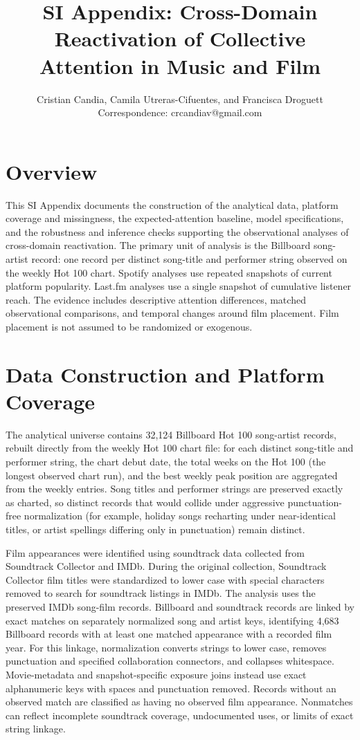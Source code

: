 \documentclass[11pt]{article}
\title{\textbf{SI Appendix: Cross-Domain Reactivation of Collective Attention in Music and Film}}
\author{Cristian Candia, Camila Utreras-Cifuentes, and Francisca Droguett\\[4pt]\small Correspondence: crcandiav@gmail.com}
\date{}
\begin{document}
\maketitle

\section*{Overview}

This SI Appendix documents the construction of the analytical data, platform coverage and missingness, the expected-attention baseline, model specifications, and the robustness and inference checks supporting the observational analyses of cross-domain reactivation. The primary unit of analysis is the Billboard song-artist record: one record per distinct song-title and performer string observed on the weekly Hot 100 chart. Spotify analyses use repeated snapshots of current platform popularity. Last.fm analyses use a single snapshot of cumulative listener reach. The evidence includes descriptive attention differences, matched observational comparisons, and temporal changes around film placement. Film placement is not assumed to be randomized or exogenous.

\section*{Data Construction and Platform Coverage}

The analytical universe contains 32,124 Billboard Hot 100 song-artist records, rebuilt directly from the weekly Hot 100 chart file: for each distinct song-title and performer string, the chart debut date, the total weeks on the Hot 100 (the longest observed chart run), and the best weekly peak position are aggregated from the weekly entries. Song titles and performer strings are preserved exactly as charted, so distinct records that would collide under aggressive punctuation-free normalization (for example, holiday songs recharting under near-identical titles, or artist spellings differing only in punctuation) remain distinct.

Film appearances were identified using soundtrack data collected from Soundtrack Collector and IMDb. During the original collection, Soundtrack Collector film titles were standardized to lower case with special characters removed to search for soundtrack listings in IMDb. The analysis uses the preserved IMDb song-film records. Billboard and soundtrack records are linked by exact matches on separately normalized song and artist keys, identifying 4,683 Billboard records with at least one matched appearance with a recorded film year. For this linkage, normalization converts strings to lower case, removes punctuation and specified collaboration connectors, and collapses whitespace. Movie-metadata and snapshot-specific exposure joins instead use exact alphanumeric keys with spaces and punctuation removed. Records without an observed match are classified as having no observed film appearance. Nonmatches can reflect incomplete soundtrack coverage, undocumented uses, or limits of exact string linkage.
\end{document}
